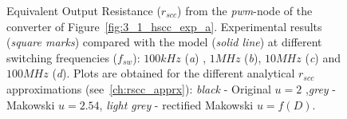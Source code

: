 \begin{figure}[!h]
\centering
    \begin{subfigure}{\textwidth}
        \parbox[c]{.03\linewidth}{\subcaption{}\label{fig:exp_rscc_pwm_node_100kHz}}
        \hspace{.02\linewidth}
        \parbox[c]{.95\linewidth}{
        \centering
        }
    \end{subfigure}

    \begin{subfigure}{\textwidth}
        \parbox[c]{.03\linewidth}{\subcaption{}\label{fig:exp_rscc_pwm_node_1MHz}}
        \hspace{.02\linewidth}
        \parbox[c]{.95\linewidth}{
        \centering
        }
    \end{subfigure}

    \begin{subfigure}{\textwidth}
        \parbox[c]{.03\linewidth}{\subcaption{}\label{fig:exp_rscc_pwm_node_10MHz}}
        \hspace{.02\linewidth}
        \parbox[c]{.95\linewidth}{
        \centering
        }
    \end{subfigure}

    \begin{subfigure}{\textwidth}
        \parbox[c]{.03\linewidth}{\subcaption{}\label{fig:exp_rscc_pwm_node_100MHz}}
        \hspace{.02\linewidth}
        \parbox[c]{.95\linewidth}{
        \centering
        }
    \end{subfigure}

\caption{Equivalent Output Resistance ($r_{scc}$) from the \emph{pwm}-node of the converter of Figure~\ref{fig:3_1_hscc_exp_a}. Experimental results (\emph{square marks}) compared with the model (\emph{solid line}) at different switching frequencies ($f_{sw}$): $100kHz$ (\emph{a}) , $1MHz$ (\emph{b}), $10MHz$ (\emph{c}) and $100MHz$ (\emph{d}). Plots are obtained for the different analytical $r_{scc}$ approximations (see~\ref{ch:rscc_apprx}): \emph{black} - Original $u=2$ ,\emph{grey} - Makowski  $u=2.54$, \emph{light grey} - rectified Makowski $u=f(D)$. }
\label{fig:exp_rscc_pwm_node_dx}
\end{figure}


